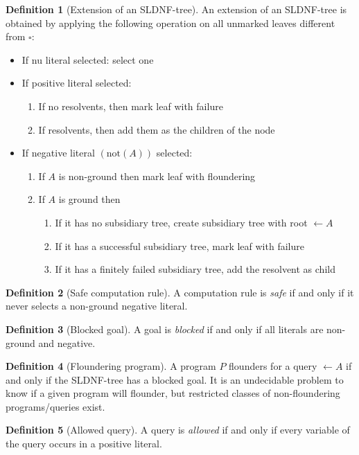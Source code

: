 \documentclass{article}
\newcommand{\brak}[1]{\ensuremath{\left(#1\right)}}
\newcommand{\fun}[2]{\ensuremath{#1\brak{#2}}}
\newcommand{\funm}[2]{\ensuremath{\fun{\mbox{#1}}{#2}}}
\newcommand{\notf}[1]{\funm{not}{#1}}
\theoremstyle{definition}
\newtheorem{definition}{Definition}
\theoremstyle{plain}
\begin{document}
\begin{definition}[Extension of an SLDNF-tree]
An extension of an SLDNF-tree is obtained by applying the following operation on all unmarked leaves different from $\square$:
\begin{itemize}
 \item If nu literal selected: select one
 \item If positive literal selected:
 \begin{enumerate}
  \item If no resolvents, then mark leaf with failure
  \item If resolvents, then add them as the children of the node
 \end{enumerate}
 \item If negative literal \brak{\notf{A}} selected:
 \begin{enumerate}
  \item If $A$ is non-ground then mark leaf with floundering
  \item If $A$ is ground then
  \begin{enumerate}
   \item If it has no subsidiary tree, create subsidiary tree with root $\leftarrow A$
   \item If it has a successful subsidiary tree, mark leaf with failure
   \item If it has a finitely failed subsidiary tree, add the resolvent as child
  \end{enumerate}
 \end{enumerate}
\end{itemize}
\end{definition}
\begin{definition}[Safe computation rule]
A computation rule is \emph{safe} if and only if it never selects a non-ground negative literal.
\end{definition}
\begin{definition}[Blocked goal]
A goal is \emph{blocked} if and only if all literals are non-ground and negative.
\end{definition}
\begin{definition}[Floundering program]
A program $P$ flounders for a query $\leftarrow A$ if and only if the SLDNF-tree has a blocked goal. It is an undecidable problem to know if a given program will flounder, but restricted classes of non-floundering programs/queries exist.
\end{definition}
\begin{definition}[Allowed query]
A query is \emph{allowed} if and only if every variable of the query occurs in a positive literal.
\end{definition}
\end{document}
